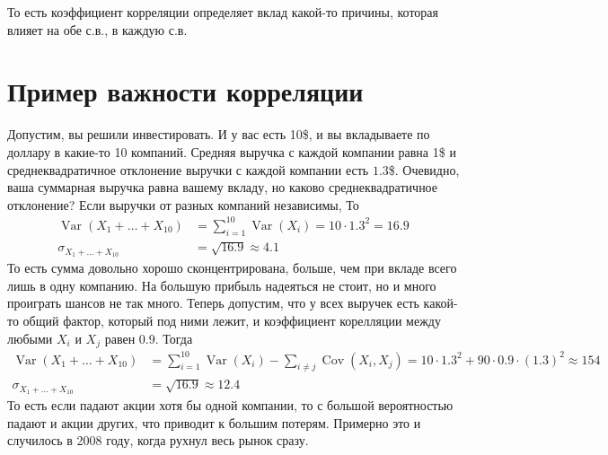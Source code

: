 \documentclass[12pt]{article}
\DeclareMathOperator{\Var}{Var}
\DeclareMathOperator{\Cov}{Cov}
\begin{document}
То есть коэффициент корреляции определяет вклад какой-то причины, которая влияет на обе с.в., в каждую с.в.

\section{Пример важности корреляции}

Допустим, вы решили инвестировать. И у вас есть 10\$, и вы вкладываете по доллару в какие-то 10 компаний. Средняя выручка с каждой компании равна 1\$ и среднеквадратичное отклонение выручки с каждой компании есть $1.3$\$. Очевидно, ваша суммарная выручка равна вашему вкладу, но каково среднеквадратичное отклонение? Если выручки от разных компаний независимы, То
\begin{align*}
  \Var(X_1 + \dots + X_10) &= \sum_{i = 1}^{10} \Var(X_i) = 10 \cdot 1.3^2 = 16.9 \\
  \sigma_{X_1 + \dots + X_10} &= \sqrt{16.9} \approx 4.1
\end{align*}
То есть сумма довольно хорошо сконцентрирована, больше, чем при вкладе всего лишь в одну компанию. На большую прибыль надеяться не стоит, но и много проиграть шансов не так много. Теперь допустим, что у всех выручек есть какой-то общий фактор, который под ними лежит, и коэффициент корелляции между любыми $X_i$ и $X_j$ равен 0.9. Тогда
\begin{align*}
  \Var(X_1 + \dots + X_10) &= \sum_{i = 1}^{10} \Var(X_i) - \sum_{i \ne j} \Cov(X_i, X_j) = 10 \cdot 1.3^2  + 90 \cdot 0.9 \cdot (1.3)^2 \approx 154 \\
  \sigma_{X_1 + \dots + X_10} &= \sqrt{16.9} \approx 12.4
\end{align*}
То есть если падают акции хотя бы одной компании, то с большой вероятностью падают и акции других, что приводит к большим потерям. Примерно это и случилось в 2008 году, когда рухнул весь рынок сразу.
\end{document}
